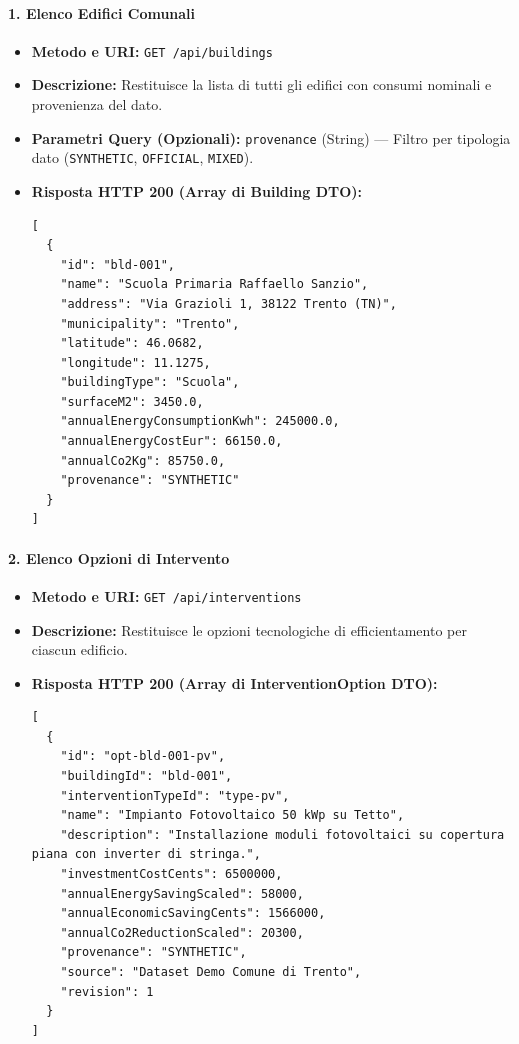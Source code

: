 \paragraph{1. Elenco Edifici Comunali}
\begin{itemize}[leftmargin=1.4em, itemsep=0.1em]
    \item \textbf{Metodo e URI:} \texttt{GET /api/buildings}
    \item \textbf{Descrizione:} Restituisce la lista di tutti gli edifici con consumi nominali e provenienza del dato.
    \item \textbf{Parametri Query (Opzionali):} \texttt{provenance} (String) --- Filtro per tipologia dato (\texttt{SYNTHETIC}, \texttt{OFFICIAL}, \texttt{MIXED}).
    \item \textbf{Risposta HTTP 200 (Array di Building DTO):}
\begin{lstlisting}
[
  {
    "id": "bld-001",
    "name": "Scuola Primaria Raffaello Sanzio",
    "address": "Via Grazioli 1, 38122 Trento (TN)",
    "municipality": "Trento",
    "latitude": 46.0682,
    "longitude": 11.1275,
    "buildingType": "Scuola",
    "surfaceM2": 3450.0,
    "annualEnergyConsumptionKwh": 245000.0,
    "annualEnergyCostEur": 66150.0,
    "annualCo2Kg": 85750.0,
    "provenance": "SYNTHETIC"
  }
]
\end{lstlisting}
\end{itemize}

\paragraph{2. Elenco Opzioni di Intervento}
\begin{itemize}[leftmargin=1.4em, itemsep=0.1em]
    \item \textbf{Metodo e URI:} \texttt{GET /api/interventions}
    \item \textbf{Descrizione:} Restituisce le opzioni tecnologiche di efficientamento per ciascun edificio.
    \item \textbf{Risposta HTTP 200 (Array di InterventionOption DTO):}
\begin{lstlisting}
[
  {
    "id": "opt-bld-001-pv",
    "buildingId": "bld-001",
    "interventionTypeId": "type-pv",
    "name": "Impianto Fotovoltaico 50 kWp su Tetto",
    "description": "Installazione moduli fotovoltaici su copertura piana con inverter di stringa.",
    "investmentCostCents": 6500000,
    "annualEnergySavingScaled": 58000,
    "annualEconomicSavingCents": 1566000,
    "annualCo2ReductionScaled": 20300,
    "provenance": "SYNTHETIC",
    "source": "Dataset Demo Comune di Trento",
    "revision": 1
  }
]
\end{lstlisting}
\end{itemize}

